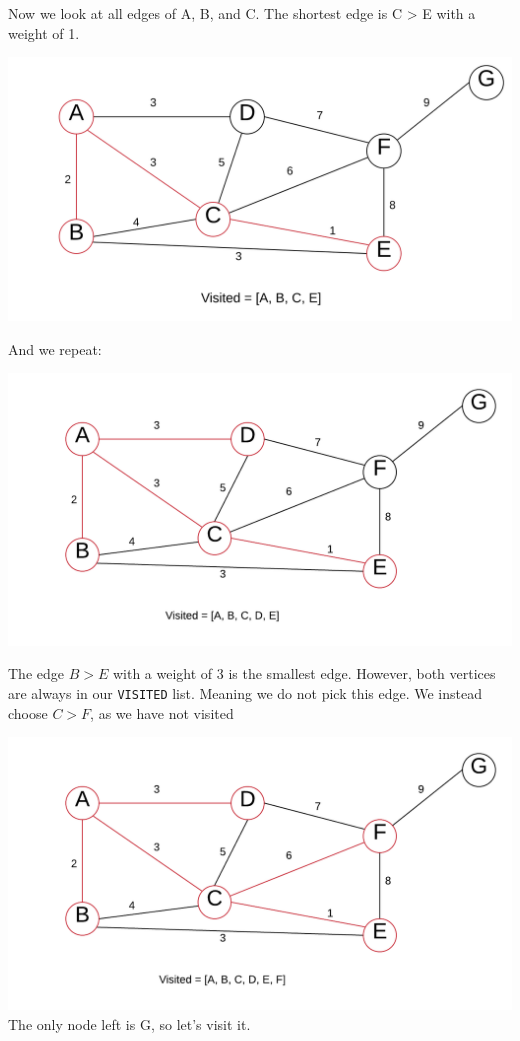 \documentclass{article}
\newcommand{\code}[1]{\texttt{#1}}
\begin{document}
Now we look at all edges of A, B, and C. The shortest edge is C > E with a weight of 1.

\includegraphics[width=\textwidth,height=\textheight,keepaspectratio]{6.png}

And we repeat:

\includegraphics[width=\textwidth,height=\textheight,keepaspectratio]{images/withD.png}

The edge $B > E$ with a weight of 3 is the smallest edge. However, both vertices are always in our \code{VISITED} list. Meaning we do not pick this edge. We instead choose $C > F$, as we have not visited 

\includegraphics[width=\textwidth,height=\textheight,keepaspectratio]{withD2.png}
The only node left is G, so let's visit it.
\end{document}
